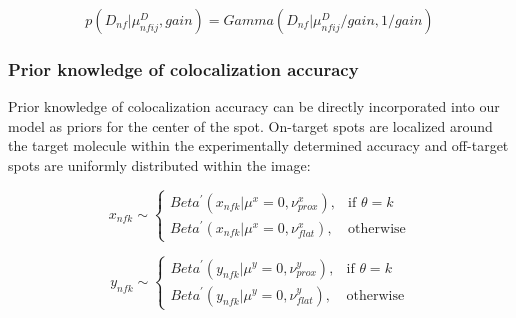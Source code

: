  \begin{equation*}
     p(D_{nf}|\mu^D_{nfij},gain) = Gamma(D_{nf}|\mu^D_{nfij}/gain,1/gain)
 \end{equation*}

\subsubsection{Prior knowledge of colocalization accuracy}

Prior knowledge of colocalization accuracy can be directly incorporated into our model as priors for the center of the spot. On-target spots are localized around the target molecule within the experimentally determined accuracy and off-target spots are uniformly distributed within the image:

\begin{equation*}
    x_{nfk} \sim
\begin{cases}
    Beta^{\prime}(x_{nfk}|\mu^x=0,\nu^x_{prox}),& \text{if } \theta = k\\
    Beta^{\prime}(x_{nfk}|\mu^x=0,\nu^x_{flat}),& \text{otherwise}
\end{cases}
\end{equation*}

\begin{equation*}
    y_{nfk} \sim
\begin{cases}
    Beta^{\prime}(y_{nfk}|\mu^y=0,\nu^y_{prox}),& \text{if } \theta = k\\
    Beta^{\prime}(y_{nfk}|\mu^y=0,\nu^y_{flat}),& \text{otherwise}
\end{cases}
\end{equation*}






